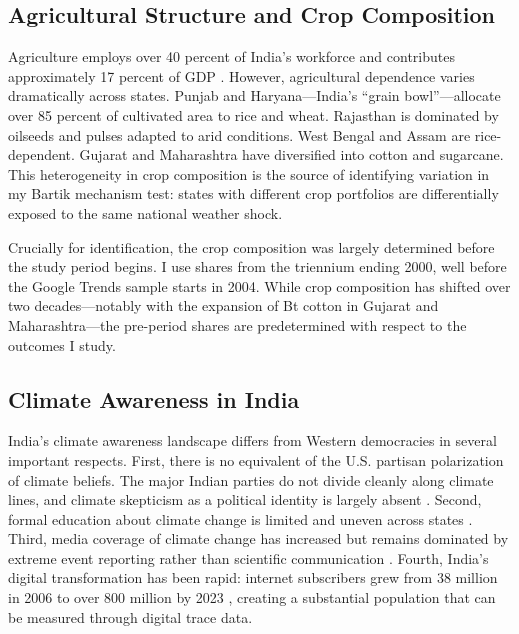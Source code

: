 \documentclass[12pt]{article}
\begin{document}
\subsection{Agricultural Structure and Crop Composition}

Agriculture employs over 40 percent of India's workforce and contributes approximately 17 percent of GDP \citep{wdi2023}. However, agricultural dependence varies dramatically across states. Punjab and Haryana---India's ``grain bowl''---allocate over 85 percent of cultivated area to rice and wheat. Rajasthan is dominated by oilseeds and pulses adapted to arid conditions. West Bengal and Assam are rice-dependent. Gujarat and Maharashtra have diversified into cotton and sugarcane. This heterogeneity in crop composition is the source of identifying variation in my Bartik mechanism test: states with different crop portfolios are differentially exposed to the same national weather shock.

Crucially for identification, the crop composition was largely determined before the study period begins. I use shares from the triennium ending 2000, well before the Google Trends sample starts in 2004. While crop composition has shifted over two decades---notably with the expansion of Bt cotton in Gujarat and Maharashtra---the pre-period shares are predetermined with respect to the outcomes I study.

\subsection{Climate Awareness in India}

India's climate awareness landscape differs from Western democracies in several important respects. First, there is no equivalent of the U.S. partisan polarization of climate beliefs. The major Indian parties do not divide cleanly along climate lines, and climate skepticism as a political identity is largely absent \citep{pewresearch2021}. Second, formal education about climate change is limited and uneven across states \citep{bangay2016}. Third, media coverage of climate change has increased but remains dominated by extreme event reporting rather than scientific communication \citep{billett2010}. Fourth, India's digital transformation has been rapid: internet subscribers grew from 38 million in 2006 to over 800 million by 2023 \citep{trai2023}, creating a substantial population that can be measured through digital trace data.
\end{document}
